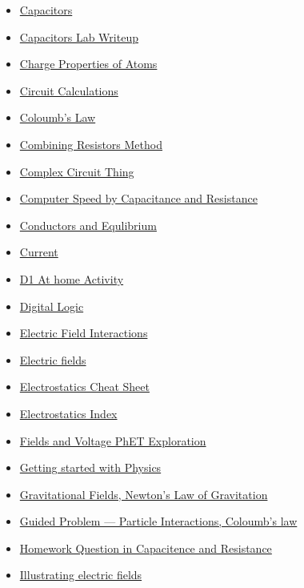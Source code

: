 \documentclass[11pt]{article}
\begin{document}
\begin{itemize}
\begin{itemize}
\item \href{phys201/KBhPHYS201Capacitors.org}{Capacitors}
\item \href{phys201/KBe20phys250retCapacitorsLabExport.org}{Capacitors Lab Writeup}
\item \href{phys201/KBhPHYS201AtomChargeProps.org}{Charge Properties of Atoms}
\item \href{phys201/KBhPHYS201CircuitCalculations.org}{Circuit Calculations}
\item \href{phys201/KBhPHYS201ColoumbsLaw.org}{Coloumb's Law}
\item \href{phys201/KBhPHYS201CombiningResistors.org}{Combining Resistors Method}
\item \href{phys201/KBe20phys250retComplexCircuitTable1.org}{Complex Circuit Thing}
\item \href{phys201/KBe20phys250retCapacitanceResistanceQuestion.org}{Computer Speed by Capacitance and Resistance}
\item \href{phys201/KBhPHYS201ConductorsEquilibrium.org}{Conductors and Equlibrium}
\item \href{phys201/KBhPHYS201Current.org}{Current}
\item \href{phys201/KBhPHYS201D1AtHomeActivity.org}{D1 At home Activity}
\item \href{phys201/KBhPHYS201DigitalLogic.org}{Digital Logic}
\item \href{phys201/KBhPHYS201ElectricFieldInteractions.org}{Electric Field Interactions}
\item \href{phys201/KBhPHYS201ElectricFields.org}{Electric fields}
\item \href{phys201/KB20200825215200.org}{Electrostatics Cheat Sheet}
\item \href{phys201/KBhPHYS201IntroToElectrostaticsLN.org}{Electrostatics Index}
\item \href{phys201/KBe20phys201retFieldsVoltagePhET.org}{Fields and Voltage PhET Exploration}
\item \href{phys201/KBhPHYS201GettingStarted.org}{Getting started with Physics}
\item \href{phys201/KBhPHYS201GravitationalFields.org}{Gravitational Fields, Newton's Law of Gravitation}
\item \href{phys201/KBhPHYS201GuidedProblemCoulomb.org}{Guided Problem --- Particle Interactions, Coloumb's law}
\item \href{phys201/KBe20phys250retCapacitenceResistanceQuestion.org}{Homework Question in Capacitence and Resistance}
\item \href{phys201/KBhPHYS201IllustratingElectricFields.org}{Illustrating electric fields}

\end{itemize}
\end{itemize}
\end{document}
